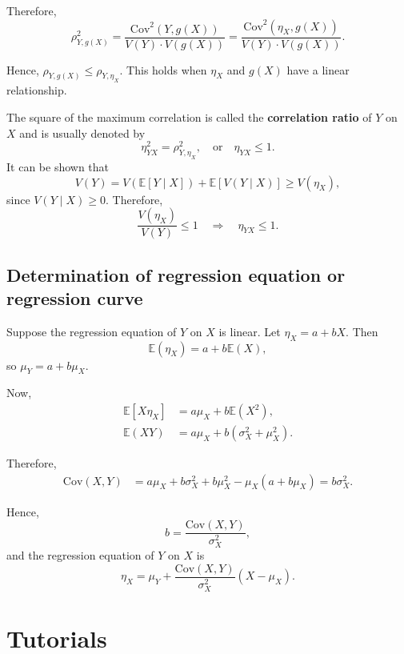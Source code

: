 Therefore,
\[
    \rho_{Y, g(X)}^2 = \frac{\text{Cov}^2(Y, g(X))}{V(Y) \cdot V(g(X))} = \frac{\text{Cov}^2(\eta_X, g(X))}{V(Y) \cdot V(g(X))}.
\]

Hence, $\rho_{Y, g(X)} \leq \rho_{Y, \eta_X}$. This holds when $\eta_X$ and $g(X)$ have a linear relationship.

\begin{remark}
    The square of the maximum correlation is called the \textbf{correlation ratio} of $Y$ on $X$ and is usually denoted by
    \[
        \eta_{YX}^2 = \rho_{Y, \eta_X}^2, \quad \text{or} \quad \eta_{YX} \leq 1.
    \]
    It can be shown that
    \[
        V(Y) = V(\mathbb{E}[Y \mid X]) + \mathbb{E}[V(Y \mid X)] \geq V(\eta_X),
    \]
    since $V(Y \mid X) \geq 0$. Therefore,
    \[
        \frac{V(\eta_X)}{V(Y)} \leq 1 \quad \Rightarrow \quad \eta_{YX} \leq 1.
    \]
\end{remark}

\subsection{Determination of regression equation or regression curve}

Suppose the regression equation of $Y$ on $X$ is linear. Let $\eta_X = a + bX$. Then
\[
    \mathbb{E}(\eta_X) = a + b\mathbb{E}(X),
\]
so $\mu_Y = a + b\mu_X$.

Now,
\begin{align*}
    \mathbb{E}[X \eta_X] &= a\mu_X + b\mathbb{E}(X^2),\\
    \mathbb{E}(XY) &= a\mu_X + b(\sigma_X^2 + \mu_X^2).
\end{align*}

Therefore,
\begin{align*}
    \text{Cov}(X, Y) &= a\mu_X + b\sigma_X^2 + b\mu_X^2 - \mu_X(a + b\mu_X) = b\sigma_X^2.
\end{align*}

Hence,
\[
    b = \frac{\text{Cov}(X, Y)}{\sigma_X^2},
\]
and the regression equation of $Y$ on $X$ is
\[
    \eta_X = \mu_Y + \frac{\text{Cov}(X, Y)}{\sigma_X^2}(X - \mu_X).
\]

\section*{Tutorials}

